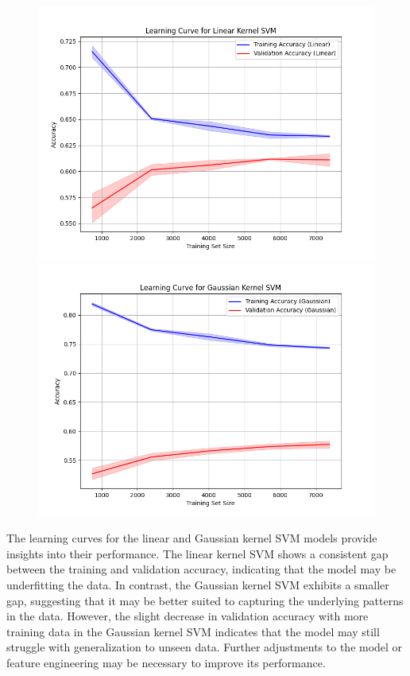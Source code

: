 \documentclass[12pt,a4paper]{article}
\begin{document}
\begin{figure}[ht]
  \centering
  \begin{minipage}{0.45\textwidth}
      \centering
      \includegraphics[width=\textwidth]{images/learning_curve_linear_SVM.png}
  \end{minipage}
  \begin{minipage}{0.45\textwidth}
      \centering
      \includegraphics[width=\textwidth]{images/learning_curve_gaussian_SVM.png}
  \end{minipage}
\end{figure}

The learning curves for the linear and Gaussian kernel SVM models provide insights into their performance. The linear kernel SVM shows a consistent gap between the training and validation accuracy, indicating that the model may be underfitting the data. In contrast, the Gaussian kernel SVM exhibits a smaller gap, suggesting that it may be better suited to capturing the underlying patterns in the data. However, the slight decrease in validation accuracy with more training data in the Gaussian kernel SVM indicates that the model may still struggle with generalization to unseen data. Further adjustments to the model or feature engineering may be necessary to improve its performance.
\end{document}
